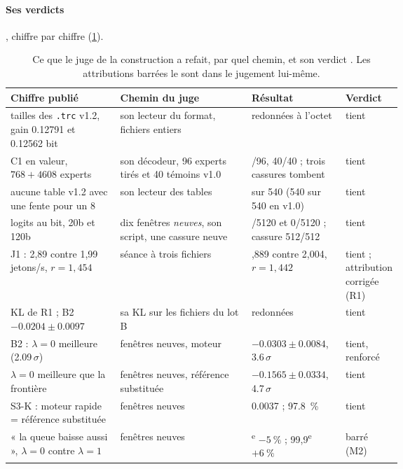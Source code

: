 \paragraph{Ses verdicts}, chiffre par chiffre (\cref{t3jug:tab:chemins}).

\begin{table}[ht]
\centering\footnotesize
\caption[Ce que le juge a refait, et par quel chemin]{Ce que le juge de la construction a refait, par quel chemin, et son verdict \mes. Les attributions barrées le sont dans le jugement lui-même.}
\label{t3jug:tab:chemins}
\begin{tabularx}{\linewidth}{@{}>{\raggedright\arraybackslash}p{0.28\linewidth}>{\raggedright\arraybackslash}X>{\raggedright\arraybackslash}p{0.24\linewidth}>{\raggedright\arraybackslash}p{0.13\linewidth}@{}}
\toprule
Chiffre publié & Chemin du juge & Résultat & Verdict \\
\midrule
tailles des \texttt{.trc} v1.2, gain \num{0.12791} et \num{0.12562} bit & son lecteur du format, fichiers entiers & redonnées à l'octet & tient \\
C1 en valeur, $768 + \num{4608}$ experts & son décodeur, 96 experts tirés et 40 témoins v1.0 & 96/96, 40/40 ; trois cassures tombent & tient \\
aucune table v1.2 avec une fente pour un 8 & son lecteur des tables & 0 sur 540 (540 sur 540 en v1.0) & tient \\
logits au bit, 20b et 120b & dix fenêtres \emph{neuves}, son script, une cassure neuve & 0/\num{5120} et 0/\num{5120} ; cassure 512/512 & tient \\
J1 : 2,89 contre 1,99 jetons/s, $r = 1{,}454$ & séance à trois fichiers & 2,889 contre 2,004, $r = 1{,}442$ & tient ; attribution corrigée (R1) \\
KL de R1 ; B2 $-\num{0.0204} \pm \num{0.0097}$ & sa KL sur les fichiers du lot B & redonnées & tient \\
B2 : $\lambda = 0$ meilleure (\num{2.09}\,$\sigma$) & fenêtres neuves, moteur & $-\num{0.0303} \pm \num{0.0084}$, \num{3.6}\,$\sigma$ & tient, renforcé \\
$\lambda = 0$ meilleure que la frontière & fenêtres neuves, référence substituée & $-\num{0.1565} \pm \num{0.0334}$, \num{4.7}\,$\sigma$ & tient \\
S3-K : moteur rapide = référence substituée & fenêtres neuves & \num{0.0037} ; \SI{97.8}{\percent} & tient \\
« la queue baisse aussi », $\lambda = 0$ contre $\lambda = 1$ & fenêtres neuves & 99\textsuperscript{e} $-\SI{5}{\percent}$ ; 99,9\textsuperscript{e} $+\SI{6}{\percent}$ & barré (M2) \\

\end{tabularx}
\end{table}
